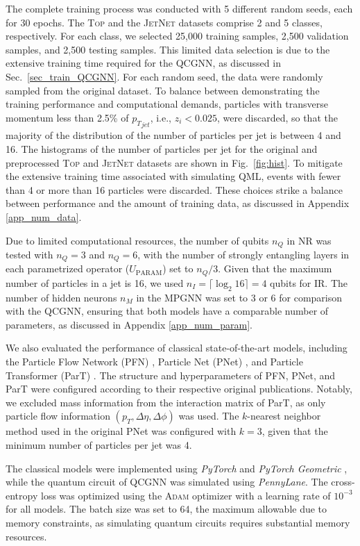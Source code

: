 \documentclass[reprint,amsmath,amssymb,prd,nofootinbib]{revtex4-2}
\def\UPARAM{U_{\text{PARAM}}}
\newcommand{\PennyLane}{\textit{PennyLane}\xspace}
\newcommand{\Top}{\textsc{Top}\xspace}
\newcommand{\JetNet}{\textsc{JetNet}\xspace}
\begin{document}
The complete training process was conducted with 5 different random seeds, each for 30 epochs. The \Top and the \JetNet datasets comprise 2 and 5 classes, respectively. For each class, we selected 25,000 training samples, 2,500 validation samples, and 2,500 testing samples. This limited data selection is due to the extensive training time required for the QCGNN, as discussed in Sec.~\ref{sec_train_QCGNN}. For each random seed, the data were randomly sampled from the original dataset. To balance between demonstrating the training performance and computational demands, particles with transverse momentum less than 2.5\% of ${p_T}_{jet}$, i.e., $z_i < 0.025$, were discarded, so that the majority of the distribution of the number of particles per jet is between 4 and 16. The histograms of the number of particles per jet for the original and preprocessed \Top and \JetNet datasets are shown in Fig.~\ref{fig:hist}. To mitigate the extensive training time associated with simulating QML, events with fewer than 4 or more than 16 particles were discarded. These choices strike a balance between performance and the amount of training data, as discussed in Appendix \ref{app_num_data}.

Due to limited computational resources, the number of qubits $n_Q$ in NR was tested with $n_Q=3$ and $n_Q=6$, with the number of strongly entangling layers in each parametrized operator ($\UPARAM$) set to $n_Q/3$. Given that the maximum number of particles in a jet is 16, we used $n_I=\lceil \log_2 16 \rceil=4$ qubits for IR. The number of hidden neurons $n_M$ in the MPGNN was set to 3 or 6 for comparison with the QCGNN, ensuring that both models have a comparable number of parameters, as discussed in Appendix \ref{app_num_param}.

We also evaluated the performance of classical state-of-the-art models, including the Particle Flow Network (PFN) \cite{pfn}, Particle Net (PNet) \cite{ptcnet}, and Particle Transformer (ParT) \cite{part}. The structure and hyperparameters of PFN, PNet, and ParT were configured according to their respective original publications. Notably, we excluded mass information from the interaction matrix of ParT, as only particle flow information $(p_T,\Delta\eta,\Delta\phi)$ was used. The $k$-nearest neighbor method used in the original PNet was configured with $k=3$, given that the minimum number of particles per jet was 4.

The classical models were implemented using \textit{PyTorch} \cite{pytorch} and \textit{PyTorch Geometric} \cite{pygeo}, while the quantum circuit of QCGNN was simulated using \PennyLane \cite{pennylane}. The cross-entropy loss was optimized using the \textsc{Adam} optimizer \cite{adam} with a learning rate of $10^{-3}$ for all models. The batch size was set to 64, the maximum allowable due to memory constraints, as simulating quantum circuits requires substantial memory resources.
\end{document}
